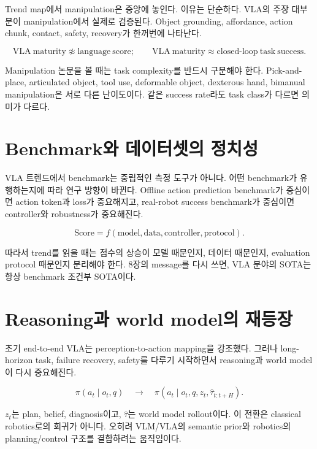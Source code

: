 Trend map에서 manipulation은 중앙에 놓인다. 이유는 단순하다. VLA의 주장 대부분이 manipulation에서 실제로 검증된다. Object grounding, affordance, action chunk, contact, safety, recovery가 한꺼번에 나타난다.

\begin{equation}
  \mathrm{VLA\ maturity}
  \not\approx
  \mathrm{language\ score};
  \qquad
  \mathrm{VLA\ maturity}
  \approx
  \mathrm{closed\mbox{-}loop\ task\ success}.
\end{equation}

Manipulation 논문을 볼 때는 task complexity를 반드시 구분해야 한다. Pick-and-place, articulated object, tool use, deformable object, dexterous hand, bimanual manipulation은 서로 다른 난이도이다. 같은 success rate라도 task class가 다르면 의미가 다르다.

\section{Benchmark와 데이터셋의 정치성}

VLA 트렌드에서 benchmark는 중립적인 측정 도구가 아니다. 어떤 benchmark가 유행하는지에 따라 연구 방향이 바뀐다. Offline action prediction benchmark가 중심이면 action token과 loss가 중요해지고, real-robot success benchmark가 중심이면 controller와 robustness가 중요해진다.

\begin{equation}
  \mathrm{Score}
  =
  f(\mathrm{model}, \mathrm{data}, \mathrm{controller}, \mathrm{protocol}).
\end{equation}

따라서 trend를 읽을 때는 점수의 상승이 모델 때문인지, 데이터 때문인지, evaluation protocol 때문인지 분리해야 한다. 8장의 message를 다시 쓰면, VLA 분야의 SOTA는 항상 benchmark 조건부 SOTA이다.

\section{Reasoning과 world model의 재등장}

초기 end-to-end VLA는 perception-to-action mapping을 강조했다. 그러나 long-horizon task, failure recovery, safety를 다루기 시작하면서 reasoning과 world model이 다시 중요해진다.

\begin{equation}
  \pi(a_t \mid o_t,q)
  \quad \rightarrow \quad
  \pi(a_t \mid o_t,q,z_t,\hat{\tau}_{t:t+H}).
\end{equation}

$z_t$는 plan, belief, diagnosis이고, $\hat{\tau}$는 world model rollout이다. 이 전환은 classical robotics로의 회귀가 아니다. 오히려 VLM/VLA의 semantic prior와 robotics의 planning/control 구조를 결합하려는 움직임이다.

